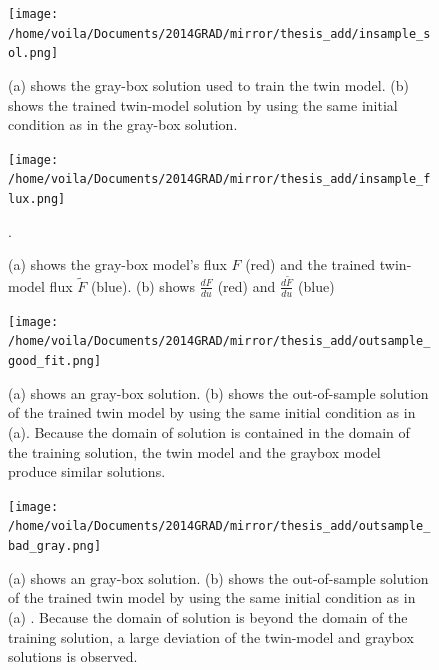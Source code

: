 
\begin{figure}[htbp]\begin{center}
    \texttt{[image: /home/voila/Documents/2014GRAD/mirror/thesis\_add/insample\_sol.png]}
    \caption{(a) shows the gray-box solution used to train the twin model. (b) shows the trained twin-model 
             solution by using the same initial condition as in the gray-box solution.}
    \label{fig: insample test}
\end{center}\end{figure}

\begin{figure}[htbp]\begin{center}
    \texttt{[image: /home/voila/Documents/2014GRAD/mirror/thesis\_add/insample\_flux.png]}
    \caption{(a) shows the gray-box model's flux $F$ (red) and the trained twin-model flux $\tilde{F}$ (blue).
             (b) shows $\frac{dF}{du}$ (red) and $\frac{d \tilde{F}}{du}$ (blue)}.
    \label{fig: flux test}
\end{center}\end{figure}

\begin{figure}[htbp]\begin{center}
    \texttt{[image: /home/voila/Documents/2014GRAD/mirror/thesis\_add/outsample\_good\_fit.png]}
    \caption{(a) shows an gray-box solution. (b) shows the out-of-sample solution of the trained twin model by using the
             same initial condition as in (a). Because the domain of solution is contained in 
the domain of the training solution, the twin model and the graybox model produce similar solutions.}
    \label{fig: outsample good test}
\end{center}\end{figure}

\begin{figure}[htbp]\begin{center}
    \texttt{[image: /home/voila/Documents/2014GRAD/mirror/thesis\_add/outsample\_bad\_gray.png]}
    \caption{(a) shows an gray-box solution. (b) shows the out-of-sample solution of the trained twin model by using the
             same initial condition as in (a) . Because the domain of solution is beyond
the domain of the training solution, a large deviation of the twin-model and graybox solutions is
observed.}
    \label{fig: outsample bad test}
\end{center}\end{figure}

